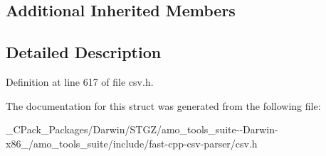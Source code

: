 \subsection*{Additional Inherited Members}


\subsection{Detailed Description}


Definition at line 617 of file csv.\+h.



The documentation for this struct was generated from the following file\+:\begin{DoxyCompactItemize}
\item 
\+\_\+\+C\+Pack\+\_\+\+Packages/\+Darwin/\+S\+T\+G\+Z/amo\+\_\+tools\+\_\+suite-\/-\/\+Darwin-\/x86\+\_/amo\+\_\+tools\+\_\+suite/include/fast-\/cpp-\/csv-\/parser/csv.\+h\end{DoxyCompactItemize}
